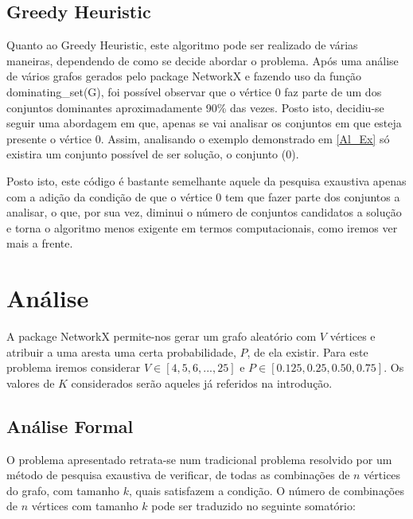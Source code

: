 \documentclass{revdetua}
\begin{document}
\subsection{Greedy Heuristic}
\label{Al_GH}

Quanto ao Greedy Heuristic, este algoritmo pode ser realizado de várias maneiras, dependendo de como se decide abordar o problema. Após uma análise de vários grafos gerados pelo package NetworkX e fazendo uso da função dominating\_set(G), foi possível observar que o vértice 0 faz parte de um dos conjuntos dominantes aproximadamente 90\% das vezes. Posto isto, decidiu-se seguir uma abordagem em que, apenas se vai analisar os conjuntos em que esteja presente o vértice 0. Assim, analisando o exemplo demonstrado em \ref{Al_Ex} só existira um conjunto possível de ser solução, o conjunto (0).

Posto isto, este código é bastante semelhante aquele da pesquisa exaustiva apenas com a adição da condição de que o vértice 0 tem que fazer parte dos conjuntos a analisar, o que, por sua vez, diminui o número de conjuntos candidatos a solução e torna o algoritmo menos exigente em termos computacionais, como iremos ver mais a frente.



\section{Análise}
A package NetworkX permite-nos gerar um grafo aleatório com $V$ vértices e atribuir a uma aresta uma certa probabilidade, $P$, de ela existir. Para este problema iremos considerar $V \in [4, 5, 6, ..., 25]$ e $P \in [0.125, 0.25, 0.50, 0.75]$. Os valores de $K$ considerados serão aqueles já referidos na introdução.



\subsection{Análise Formal}
\label{AnlForm}

O problema apresentado retrata-se num tradicional problema resolvido por um método de pesquisa exaustiva de verificar, de todas as combinações de $n$ vértices do grafo, com tamanho $k$, quais satisfazem a condição. O número de combinações de $n$ vértices com tamanho $k$ pode ser traduzido no seguinte somatório:
\end{document}
